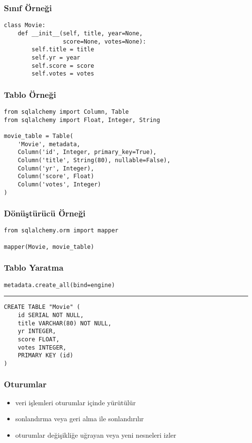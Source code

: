 \documentclass[dvipsnames]{beamer}
\theoremstyle{plain}
\begin{document}
\begin{frame}[fragile]
  \frametitle{Sınıf Örneği}

  \begin{lstlisting}
class Movie:
    def __init__(self, title, year=None,
                 score=None, votes=None):
        self.title = title
        self.yr = year
        self.score = score
        self.votes = votes
  \end{lstlisting}
\end{frame}

\begin{frame}[fragile]
  \frametitle{Tablo Örneği}

  \begin{lstlisting}
from sqlalchemy import Column, Table
from sqlalchemy import Float, Integer, String

movie_table = Table(
    'Movie', metadata,
    Column('id', Integer, primary_key=True),
    Column('title', String(80), nullable=False),
    Column('yr', Integer),
    Column('score', Float)
    Column('votes', Integer)
)
  \end{lstlisting}
\end{frame}

\begin{frame}[fragile]
  \frametitle{Dönüştürücü Örneği}

  \begin{lstlisting}
from sqlalchemy.orm import mapper

mapper(Movie, movie_table)
  \end{lstlisting}
\end{frame}

\begin{frame}[fragile]
  \frametitle{Tablo Yaratma}

  \begin{lstlisting}
metadata.create_all(bind=engine)
  \end{lstlisting}
  \hrule

  \begin{lstlisting}[language=FullSQL]
CREATE TABLE "Movie" (
    id SERIAL NOT NULL,
    title VARCHAR(80) NOT NULL,
    yr INTEGER,
    score FLOAT,
    votes INTEGER,
    PRIMARY KEY (id)
)
  \end{lstlisting}
\end{frame}

\begin{frame}
  \frametitle{Oturumlar}

  \begin{itemize}
    \item veri işlemleri oturumlar içinde yürütülür
    \item sonlandırma veya geri alma ile sonlandırılır
    \item oturumlar değişikliğe uğrayan veya yeni nesneleri izler
  \end{itemize}
\end{frame}
\end{document}

